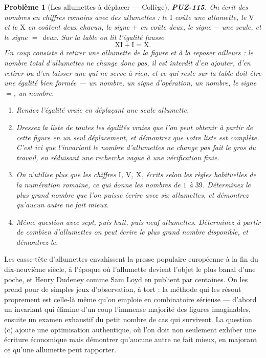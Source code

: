 \documentclass[11pt]{article}
\newtheorem{problem}{Problème}
\begin{document}
\begin{problem}[{Les allumettes à déplacer --- Collège}]
\textbf{PUZ-115.} On écrit des nombres en chiffres romains avec des allumettes : le
$ \mathrm{I} $ coûte une allumette, le $ \mathrm{V} $ et le $ \mathrm{X} $ en coûtent
deux chacun, le signe $ + $ en coûte deux, le signe $ - $ une seule, et le signe $ = $
deux. Sur la table on lit l'égalité fausse
\[ \mathrm{XI} + \mathrm{I} = \mathrm{X}. \]
Un coup consiste à retirer une allumette de la figure et à la reposer ailleurs : le nombre
total d'allumettes ne change donc pas, il est interdit d'en ajouter, d'en retirer ou d'en
laisser une qui ne serve à rien, et ce qui reste sur la table doit être une égalité bien
formée --- un nombre, un signe d'opération, un nombre, le signe $ = $, un nombre.
\begin{enumerate}
\item[(a)] Rendez l'égalité vraie en déplaçant une seule allumette.
\item[(b)] Dressez la liste de toutes les égalités vraies que l'on peut obtenir à partir de cette
figure en un seul déplacement, et démontrez que votre liste est complète. C'est ici que
l'invariant \og{} le nombre d'allumettes ne change pas \fg{} fait le gros du travail, en réduisant une
recherche vague à une vérification finie.
\item[(c)] On n'utilise plus que les chiffres $ \mathrm{I} $, $ \mathrm{V} $, $ \mathrm{X} $,
écrits selon les règles habituelles de la numération romaine, ce qui donne les nombres de
$ 1 $ à $ 39 $. Déterminez le plus grand nombre que l'on puisse écrire avec six
allumettes, et démontrez qu'aucun autre ne fait mieux.
\item[(d)] Même question avec sept, puis huit, puis neuf allumettes. Déterminez à partir de combien
d'allumettes on peut écrire le plus grand nombre disponible, et démontrez-le.
\end{enumerate}

\end{problem}

\noindent Les casse-tête d'allumettes envahissent la presse populaire européenne à la
fin du dix-neuvième siècle, à l'époque où l'allumette devient l'objet le plus banal d'une
poche, et Henry Dudeney comme Sam Loyd en publient par centaines. On les prend pour de simples
jeux d'observation, à tort : la méthode qui les résout proprement est celle-là même qu'on
emploie en combinatoire sérieuse --- d'abord un invariant qui élimine d'un coup l'immense
majorité des figures imaginables, ensuite un examen exhaustif du petit nombre de cas qui
survivent. La question (c) ajoute une optimisation authentique, où l'on doit non seulement
exhiber une écriture économique mais démontrer qu'aucune autre ne fait mieux, en majorant ce
qu'une allumette peut rapporter.
\end{document}
